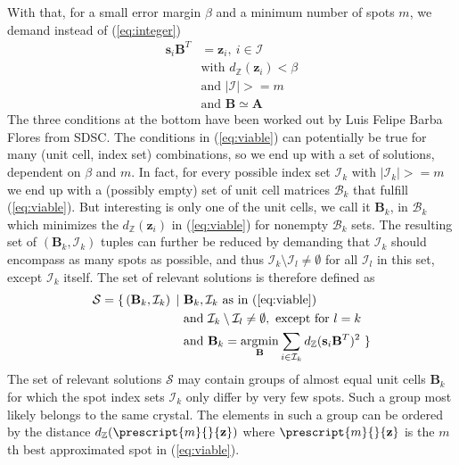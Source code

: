 \documentclass[a4paper,10pt]{article}
\DeclareMathOperator*{\argmin}{argmin}
\newcommand{\vect}[1]{\mathbf{#1}}
\newcommand{\mat}[1]{\mathbf{#1}}
\newcommand{\distZ}[1]{d_\mathbb{Z}(#1)}
\begin{document}
%
With that, for a small error margin $\beta$ and a minimum number of spots $m$, we demand instead of (\ref{eq:integer})
%
\begin{equation}\label{eq:viable}
 \begin{split}
  \vect{s}_i \mat{B}^T &= \vect{z}_i,\ i \in \mathcal{I} \\
  &\text{with }\distZ{\vect{z}_i} < \beta \\
  &\text{and }|\mathcal{I}| >= m \\
  &\text{and }\mat{B} \simeq \mat{A}
 \end{split}
\end{equation}
%
The three conditions at the bottom have been worked out by Luis Felipe Barba Flores from SDSC. The conditions in (\ref{eq:viable}) can potentially be true for many (unit cell, index set) combinations, so we end up with a set of solutions, dependent on $\beta$ and $m$. In fact, for every possible index set $\mathcal{I}_k$ with $|\mathcal{I}_k| >= m$ we end up with a (possibly empty) set of unit cell matrices $\mathcal{B}_k$ that fulfill (\ref{eq:viable}). But interesting is only one of the unit cells, we call it $\mat{B}_k$, in $\mathcal{B}_k$ which minimizes the $\distZ{\vect{z}_i}$ in (\ref{eq:viable}) for nonempty $\mathcal{B}_k$ sets. The resulting set of $(\mat{B}_k, \mathcal{I}_k)$ tuples can further be reduced by demanding that $\mathcal{I}_k$ should encompass as many spots as possible, and thus $\mathcal{I}_k \setminus \mathcal{I}_l \neq \emptyset$ for all $\mathcal{I}_l$ in this set, except $\mathcal{I}_k$ itself. The set of relevant solutions is therefore defined as
%
\begin{equation}\label{eq:solution-set}
 \begin{split}
  \mathcal{S} = \{\, (\mat{B}_k, \mathcal{I}_k)\,\mid\ &\mat{B}_k, \mathcal{I}_k\text{ as in (\ref{eq:viable})} \\
  &\text{and }\mathcal{I}_k \setminus \mathcal{I}_l \neq \emptyset,\text{ except for }l=k \\
  &\text{and }\mat{B}_k = \argmin_{\mat{B}} \sum_{i \in \mathcal{I}_k} \distZ{\vect{s}_i \mat{B}^T}^2\ \}
 \end{split}
\end{equation}
%
The set of relevant solutions $\mathcal{S}$ may contain groups of almost equal unit cells $\mat{B}_k$ for which the spot index sets $\mathcal{I}_k$ only differ by very few spots. Such a group most likely belongs to the same crystal. The elements in such a group can be ordered by the distance $\distZ{\prescript{m}{}{\vect{z}}}$ where $\prescript{m}{}{\vect{z}}$ is the $m$th best approximated spot in (\ref{eq:viable}).
\end{document}
